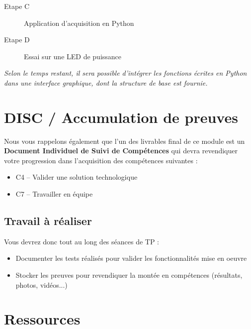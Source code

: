 \documentclass[a4paper,11pt,titlepage]{article} %
\begin{document}
	\begin{description}
		\item[Etape C] Application d'acquisition en Python
		\item[Etape D] Essai sur une LED de puissance
	\end{description}

\medskip

\textit{Selon le temps restant, il sera possible d'intégrer les fonctions écrites en Python dans une interface graphique, dont la structure de base est fournie.}


\section{DISC / Accumulation de preuves}

Nous vous rappelons également que l'un des livrables final de ce module est un \textbf{Document Individuel de Suivi de Compétences} qui devra revendiquer votre progression dans l'acquisition des compétences suivantes :

\begin{itemize}
	\item C4 – Valider une solution technologique
	\item C7 – Travailler en équipe
\end{itemize}

\subsection{Travail à réaliser}

Vous devrez donc tout au long des séances de TP : 

\begin{itemize}
	\item Documenter les tests réalisés pour valider les fonctionnalités mise en oeuvre
	\item Stocker les preuves pour revendiquer la montée en compétences (résultats, photos, vidéos...)
\end{itemize}




\section{Ressources}
\end{document}
